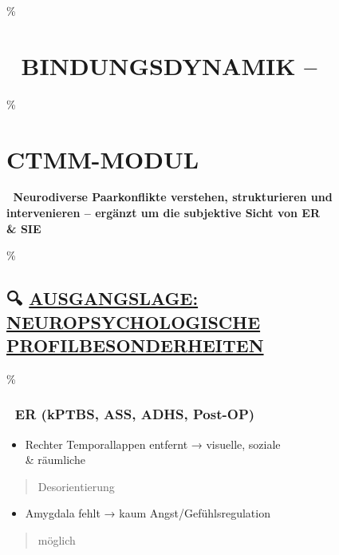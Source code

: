 \hypertarget{bindungsdynamik}{\%
\section{\texorpdfstring{🧾 \textbf{BINDUNGSDYNAMIK --} }{🧾 BINDUNGSDYNAMIK -- }}\label{bindungsdynamik}}

\hypertarget{ctmm-modul}{\%
\section{\texorpdfstring{\textbf{CTMM-MODUL}}{CTMM-MODUL}}\label{ctmm-modul}}

🧩 \textbf{Neurodiverse Paarkonflikte verstehen, strukturieren und intervenieren -- ergänzt um die subjektive Sicht von ER \\& SIE}

\hypertarget{ausgangslage-neuropsychologische-profilbesonderheiten}{\%
\subsection{\texorpdfstring{🔍 \textbf{\ul{AUSGANGSLAGE: NEUROPSYCHOLOGISCHE PROFILBESONDERHEITEN}}}{🔍 AUSGANGSLAGE: NEUROPSYCHOLOGISCHE PROFILBESONDERHEITEN}}\label{ausgangslage-neuropsychologische-profilbesonderheiten}}

\hypertarget{er-kptbs-ass-adhs-post-op}{\%
\subsubsection{\texorpdfstring{🔵 \textbf{ER (kPTBS, ASS, ADHS, Post-OP)}}{🔵 ER (kPTBS, ASS, ADHS, Post-OP)}}\label{er-kptbs-ass-adhs-post-op}}

\begin{itemize}
\tightlist
\item
  Rechter Temporallappen entfernt → visuelle, soziale \\& räumliche
\end{itemize}

\begin{quote}
Desorientierung
\end{quote}

\begin{itemize}
\tightlist
\item
  Amygdala fehlt → kaum Angst/Gefühlsregulation
\end{itemize}

\begin{quote}
möglich
\end{quote}

